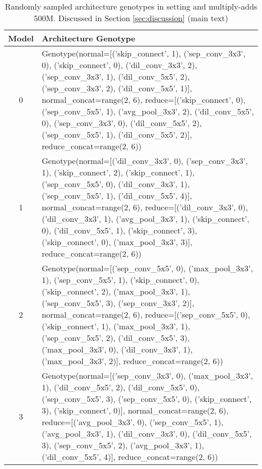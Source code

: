 \documentclass[runningheads]{llncs}
\begin{document}
\begin{table*}
	\begin{center}
		\caption{Randomly sampled architecture genotypes in  setting  and multiply-adds  500M. Discussed in Section \ref{sec:discussion} (main text)}
		\label{tab:random-m2500flops}
		\begin{footnotesize}
			\begin{tabular}{cp{11cm}}  
				\hline
				Model & Architecture Genotype  \\
				\hline
				0 & Genotype(normal=[('skip\_connect', 1), ('sep\_conv\_3x3', 0), ('skip\_connect', 0), ('dil\_conv\_3x3', 2), ('sep\_conv\_3x3', 1), ('dil\_conv\_5x5', 2), ('sep\_conv\_3x3', 2), ('dil\_conv\_5x5', 1)], normal\_concat=range(2, 6),
				reduce=[('skip\_connect', 0), ('sep\_conv\_5x5', 1), ('avg\_pool\_3x3', 2), ('dil\_conv\_5x5', 0), ('sep\_conv\_3x3', 0), ('dil\_conv\_5x5', 2), ('sep\_conv\_5x5', 1), ('dil\_conv\_5x5', 2)], reduce\_concat=range(2, 6))
				
				\\
				1 &  Genotype(normal=[('dil\_conv\_3x3', 0), ('sep\_conv\_3x3', 1), ('skip\_connect', 2), ('skip\_connect', 1), ('sep\_conv\_5x5', 0), ('dil\_conv\_3x3', 1), ('sep\_conv\_5x5', 1), ('dil\_conv\_5x5', 4)], normal\_concat=range(2, 6),
				reduce=[('dil\_conv\_3x3', 0), ('dil\_conv\_3x3', 1), ('avg\_pool\_3x3', 1), ('skip\_connect', 0), ('dil\_conv\_5x5', 1), ('skip\_connect', 3), ('skip\_connect', 0), ('max\_pool\_3x3', 3)], reduce\_concat=range(2, 6))
				
				\\
				2 & Genotype(normal=[('sep\_conv\_5x5', 0), ('max\_pool\_3x3', 1), ('sep\_conv\_5x5', 1), ('skip\_connect', 0), ('skip\_connect', 2), ('max\_pool\_3x3', 1), ('sep\_conv\_5x5', 3), ('sep\_conv\_3x3', 2)], normal\_concat=range(2, 6),
				reduce=[('sep\_conv\_5x5', 0), ('skip\_connect', 1), ('max\_pool\_3x3', 1), ('sep\_conv\_5x5', 2), ('dil\_conv\_5x5', 3), ('max\_pool\_3x3', 0), ('dil\_conv\_3x3', 1), ('max\_pool\_3x3', 2)], reduce\_concat=range(2, 6))
				
				\\
				3 & Genotype(normal=[('sep\_conv\_3x3', 0), ('max\_pool\_3x3', 1), ('dil\_conv\_5x5', 2), ('dil\_conv\_5x5', 0), ('sep\_conv\_5x5', 3), ('sep\_conv\_5x5', 0), ('skip\_connect', 3), ('skip\_connect', 0)], normal\_concat=range(2, 6),
				reduce=[('avg\_pool\_3x3', 0), ('sep\_conv\_5x5', 1), ('avg\_pool\_3x3', 1), ('dil\_conv\_3x3', 0), ('dil\_conv\_5x5', 3), ('sep\_conv\_5x5', 2), ('avg\_pool\_3x3', 1), ('dil\_conv\_5x5', 4)], reduce\_concat=range(2, 6))
				

\end{tabular}
\end{footnotesize}
\end{center}
\end{table*}
\end{document}
